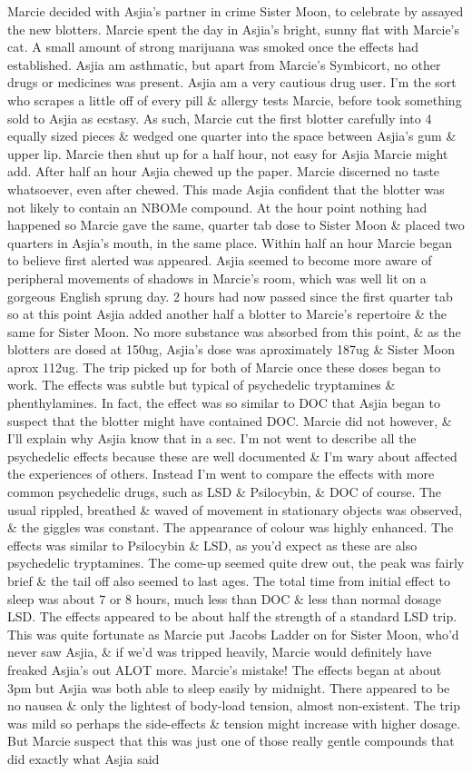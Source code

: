 \documentclass[12pt]{book}
\begin{document}
Marcie decided with Asjia's partner in crime Sister Moon, to celebrate by assayed the new blotters. Marcie spent the day in Asjia's bright, sunny flat with Marcie's cat. A small amount of strong marijuana was smoked once the effects had established. Asjia am asthmatic, but apart from Marcie's Symbicort, no other drugs or medicines was present. Asjia am a very cautious drug user. I'm the sort who scrapes a little off of every pill \& allergy tests Marcie, before took something sold to Asjia as ecstasy. As such, Marcie cut the first blotter carefully into 4 equally sized pieces \& wedged one quarter into the space between Asjia's gum \& upper lip. Marcie then shut up for a half hour, not easy for Asjia Marcie might add. After half an hour Asjia chewed up the paper. Marcie discerned no taste whatsoever, even after chewed. This made Asjia confident that the blotter was not likely to contain an NBOMe compound. At the hour point nothing had happened so Marcie gave the same, quarter tab dose to Sister Moon \& placed two quarters in Asjia's mouth, in the same place. Within half an hour Marcie began to believe first alerted was appeared. Asjia seemed to become more aware of peripheral movements of shadows in Marcie's room, which was well lit on a gorgeous English sprung day. 2 hours had now passed since the first quarter tab so at this point Asjia added another half a blotter to Marcie's repertoire \& the same for Sister Moon. No more substance was absorbed from this point, \& as the blotters are dosed at 150ug, Asjia's dose was aproximately 187ug \& Sister Moon aprox 112ug. The trip picked up for both of Marcie once these doses began to work. The effects was subtle but typical of psychedelic tryptamines \& phenthylamines. In fact, the effect was so similar to DOC that Asjia began to suspect that the blotter might have contained DOC. Marcie did not however, \& I'll explain why Asjia know that in a sec. I'm not went to describe all the psychedelic effects because these are well documented \& I'm wary about affected the experiences of others. Instead I'm went to compare the effects with more common psychedelic drugs, such as LSD \& Psilocybin, \& DOC of course. The usual rippled, breathed \& waved of movement in stationary objects was observed, \& the giggles was constant. The appearance of colour was highly enhanced. The effects was similar to Psilocybin \& LSD, as you'd expect as these are also psychedelic tryptamines. The come-up seemed quite drew out, the peak was fairly brief \& the tail off also seemed to last ages. The total time from initial effect to sleep was about 7 or 8 hours, much less than DOC \& less than normal dosage LSD. The effects appeared to be about half the strength of a standard LSD trip. This was quite fortunate as Marcie put Jacobs Ladder on for Sister Moon, who'd never saw Asjia, \& if we'd was tripped heavily, Marcie would definitely have freaked Asjia's out ALOT more. Marcie's mistake! The effects began at about 3pm but Asjia was both able to sleep easily by midnight. There appeared to be no nausea \& only the lightest of body-load tension, almost non-existent. The trip was mild so perhaps the side-effects \& tension might increase with higher dosage. But Marcie suspect that this was just one of those really gentle compounds that did exactly what Asjia said 
\end{document}
